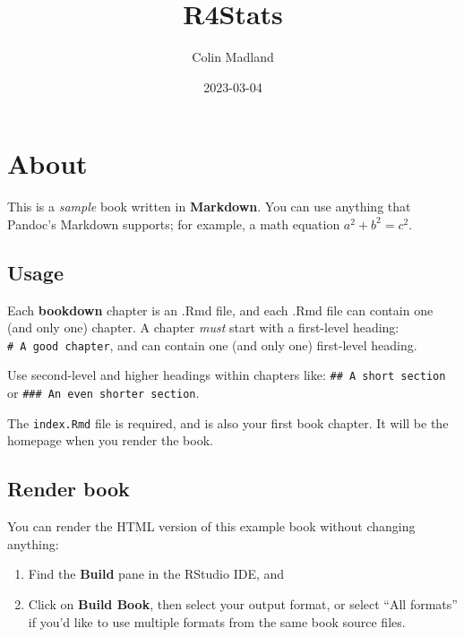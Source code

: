 \documentclass[
]{book}
\title{R4Stats}
\author{Colin Madland}
\date{2023-03-04}
\theoremstyle{definition}
\theoremstyle{definition}
\theoremstyle{definition}
\theoremstyle{definition}
\theoremstyle{remark}
\begin{document}
\maketitle

{
\setcounter{tocdepth}{1}
\tableofcontents
}
\hypertarget{about}{%
\chapter*{About}\label{about}}

This is a \emph{sample} book written in \textbf{Markdown}. You can use anything that Pandoc's Markdown supports; for example, a math equation \(a^2 + b^2 = c^2\).

\hypertarget{usage}{%
\section*{Usage}\label{usage}}

Each \textbf{bookdown} chapter is an .Rmd file, and each .Rmd file can contain one (and only one) chapter. A chapter \emph{must} start with a first-level heading: \texttt{\#\ A\ good\ chapter}, and can contain one (and only one) first-level heading.

Use second-level and higher headings within chapters like: \texttt{\#\#\ A\ short\ section} or \texttt{\#\#\#\ An\ even\ shorter\ section}.

The \texttt{index.Rmd} file is required, and is also your first book chapter. It will be the homepage when you render the book.

\hypertarget{render-book}{%
\section*{Render book}\label{render-book}}

You can render the HTML version of this example book without changing anything:

\begin{enumerate}
\def\labelenumi{\arabic{enumi}.}
\item
  Find the \textbf{Build} pane in the RStudio IDE, and
\item
  Click on \textbf{Build Book}, then select your output format, or select ``All formats'' if you'd like to use multiple formats from the same book source files.
\end{enumerate}
\end{document}

